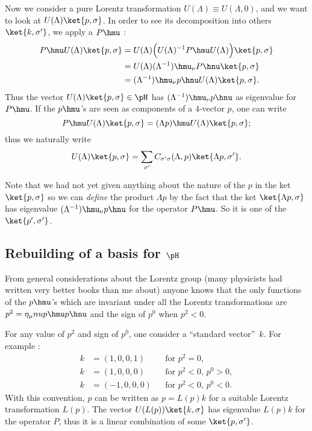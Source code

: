 Now we consider a pure Lorentz transformation $U(\Lambda)\equiv U(\Lambda,0)$, and we want to look at $U(\Lambda)\ket{p,\sigma}$. In order to see its decomposition into others $\ket{k,\sigma'}$, we apply a $P\hmu$ :
\begin{equation}
\begin{split}  
  P\hmu U(\Lambda)\ket{p,\sigma}&=U(\Lambda)\Big( U(\Lambda)^{-1} P\hmu U(\Lambda)  \Big)\ket{p,\sigma}\\
                                &=U(\Lambda) {(\Lambda^{-1})}\hmu_{\nu} P\hnu \ket{p,\sigma}\\
				&=(\Lambda^{-1})\hmu_{\nu} p\hnu U(\Lambda)\ket{p,\sigma}.
\end{split}				
\end{equation}
Thus the vector $U(\Lambda)\ket{p,\sigma}\in\pH$ has $(\Lambda^{-1})\hmu_{\nu} p\hnu$ as eigenvalue for $P\hmu$. If the $p\hmu$'s are seen as components of a $4$-vector $p$, one can write
\[
    P\hmu U(\Lambda)\ket{p,\sigma}=(\Lambda p)\hmu U(\Lambda)\ket{p,\sigma};
\]    
     thus we naturally write  
\begin{equation}     
  U(\Lambda)\ket{p,\sigma}=\sum_{\sigma'}C_{\sigma'\sigma}(\Lambda,p)\ket{\Lambda p,\sigma'}.
\end{equation}
       

Note that we had not yet given anything about the nature of the $p$ in the ket $\ket{p,\sigma}$ so we can \emph{define} the product $\Lambda p$ by the fact that the ket $\ket{\Lambda p,\sigma}$ has eigenvalue $(\Lambda^{-1})\hmu_{\nu} p\hnu$ for the operator $P\hmu$. So it is one of the $\ket{p',\sigma'}$.

\subsection{Rebuilding of a basis for \texorpdfstring{$\pH$}{H}}

From general considerations about the Lorentz group (many physicists had written very better books than me about) anyone knows that the only functions of the $p\hmu$'s  which are invariant under all the Lorentz transformations are $p^2=\eta_{\mu}nu p\hmu p\hnu$ and the sign of $p^0$ when $p^2< 0$.

For any value of $p^2$ and sign of $p^0$, one consider a ``standard vector''\ $k$. For example :
\begin{subequations}
\begin{align}
   k&=(1,0,0,1)&&\text{for $p^2=0$},\\
   k&=(1,0,0,0)&&\text{for $p^2<0$, $p^0>0$},\\
   k&=(-1,0,0,0)&&\text{for $p^2<0$, $p^0<0$}.
\end{align}   
\end{subequations}
With this convention, $p$ can be written as $p=L(p)k$ for a suitable Lorentz transformation $L(p)$. The vector $U(L(p))\ket{k,\sigma}$ has eigenvalue $L(p)k$ for the operator $P$, thus it is a linear combination of some $\ket{p,\sigma'}$.

